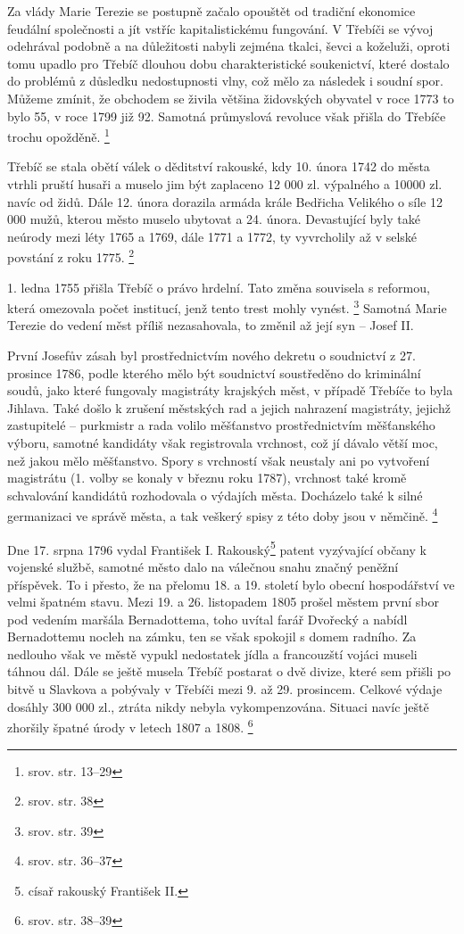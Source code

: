 \documentclass[a4paper,oneside,12pt]{report}
\begin{document}
Za vlády Marie Terezie se postupně začalo opouštět od tradiční ekonomice feudální společnosti a jít vstříc kapitalistickému fungování.
V Třebíči se vývoj odehrával podobně a na důležitosti nabyli zejména tkalci, ševci a koželuži, oproti tomu upadlo pro Třebíč dlouhou dobu charakteristické soukenictví, které dostalo do problémů z důsledku nedostupnosti vlny, což mělo za následek i soudní spor.
Můžeme zmínit, že obchodem se živila většina židovských obyvatel v roce 1773 to bylo 55, v roce 1799 již 92.
Samotná průmyslová revoluce však přišla do Třebíče trochu opožděně. \footnote{srov. \cite{Janak1981} str. 13--29}

Třebíč se stala obětí válek o děditství rakouské, kdy 10. února 1742 do města vtrhli pruští husaři a muselo jim být zaplaceno 12 000 zl. výpalného a 10000 zl. navíc od židů.
Dále 12. února dorazila armáda krále Bedřicha Velikého o síle 12 000 mužů, kterou město muselo ubytovat a 24. února.
Devastující byly také neúrody mezi léty 1765 a 1769, dále 1771 a 1772, ty vyvrcholily až v selské povstání z roku 1775. \footnote{srov. \cite{Janak1981} str. 38}

1. ledna 1755 přišla Třebíč o právo hrdelní.
Tato změna souvisela s reformou, která omezovala počet institucí, jenž tento trest mohly vynést. \footnote{srov. \cite{Janak1981} str. 39}
Samotná Marie Terezie do vedení měst příliš nezasahovala, to změnil až její syn -- Josef II.

První Josefův zásah byl prostřednictvím nového dekretu o soudnictví z 27. prosince 1786, podle kterého mělo být soudnictví soustředěno do kriminální soudů, jako které fungovaly magistráty krajských měst, v případě Třebíče to byla Jihlava.
Také došlo k zrušení městských rad a jejich nahrazení magistráty, jejichž zastupitelé -- purkmistr a rada volilo měšťanstvo prostřednictvím měšťanského výboru, samotné kandidáty však registrovala vrchnost, což jí dávalo větší moc, než jakou mělo měšťanstvo.
Spory s vrchností však neustaly ani po vytvoření magistrátu (1. volby se konaly v březnu roku 1787), vrchnost také kromě schvalování kandidátů rozhodovala o výdajích města.
Docházelo také k silné germanizaci ve správě města, a tak veškerý spisy z této doby jsou v němčině. \footnote{srov. \cite{Janak1981} str. 36--37}

Dne 17. srpna 1796 vydal František I. Rakouský\footnote{císař rakouský František II.} patent vyzývající občany k vojenské službě, samotné město dalo na válečnou snahu značný peněžní příspěvek.
To i přesto, že na přelomu 18. a 19. století bylo obecní hospodářství ve velmi špatném stavu.
Mezi 19. a 26. listopadem 1805 prošel městem první sbor pod vedením maršála Bernadottema, toho uvítal farář Dvořecký a nabídl Bernadottemu nocleh na zámku, ten se však spokojil s domem radního.
Za nedlouho však ve městě vypukl nedostatek jídla a francouzští vojáci museli táhnou dál.
Dále se ještě musela Třebíč postarat o dvě divize, které sem přišli po bitvě u Slavkova a pobývaly v Třebíči mezi 9. až 29. prosincem.
Celkové výdaje dosáhly 300 000 zl., ztráta nikdy nebyla vykompenzována.
Situaci navíc ještě zhoršily špatné úrody v letech 1807 a 1808. \footnote{srov. \cite{Janak1981} str. 38--39}
\end{document}
